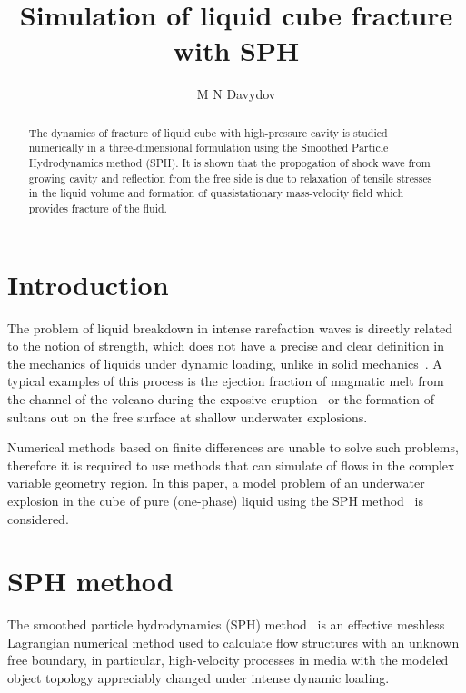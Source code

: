 \documentclass[a4paper]{jpconf}
\begin{document}
\title{Simulation of liquid cube fracture with SPH}

\author{M N Davydov}

\address{Lavrentyev Institute of Hydrodynamics of the Siberian Branch of the Russian Academy of Sciences, Novosibirsk, Russia}



\begin{abstract}
The dynamics of fracture of liquid cube with high-pressure cavity is studied numerically in a three-dimensional formulation using the Smoothed Particle Hydrodynamics method (SPH).  It is shown that the propogation of shock wave from growing cavity and reflection from the free side is due to relaxation of tensile stresses in the liquid volume and formation of quasistationary mass-velocity field which provides fracture of the fluid. 
\end{abstract}

\section{Introduction}

The problem of liquid breakdown in intense rarefaction waves is directly related to the
notion of strength, which does not have a precise and clear definition in the mechanics of liquids under dynamic
loading, unlike in solid mechanics~\cite{DavydovKedrinskii2008}. A typical examples of this process is the ejection fraction of magmatic melt from the channel of the volcano during the exposive eruption~\cite{Davydov2012a} or the formation of sultans out on the free surface at shallow underwater explosions.


Numerical methods based on finite differences are unable to solve such problems, therefore it is  required to use methods that can simulate of flows in the complex variable geometry region. In this paper, a model problem of an underwater explosion in the cube of pure (one-phase) liquid using the SPH method~\cite{Monaghan2005}  is considered.

\section{SPH method}

The smoothed particle hydrodynamics (SPH) method~\cite{Monaghan1992,Monaghan2005} is an effective meshless Lagrangian numerical
method used to calculate flow structures with an unknown free boundary, in particular, high-velocity processes in
media with the modeled object topology appreciably changed under intense dynamic loading.
\end{document}

